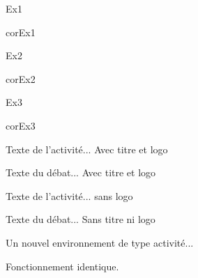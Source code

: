 \documentclass[nocrop]{sesamanuel}
\begin{document}
\begin{autoeval}
  \begin{multicols}{2}
    \begin{exercice}
      Ex1
    \end{exercice}
    \begin{corrige}
      corEx1
    \end{corrige}
    \begin{exercice}
      Ex2
    \end{exercice}
    \begin{corrige}
      corEx2
    \end{corrige}
\vfill \columnbreak
    \begin{exercice}
      Ex3
    \end{exercice}
    \begin{corrige}
      corEx3
    \end{corrige}
  \end{multicols}
\end{autoeval}


  \activites
  \begin{activite}
  Texte de l’activité... Avec titre et logo
  \end{activite}
  \begin{debat}
  Texte du débat... Avec titre et logo
  \end{debat}
  \begin{activite}
  Texte de l’activité... sans logo
  \end{activite}
  \begin{debat}
  Texte du débat... Sans titre ni logo
  \end{debat}
  \begin{nouveau}[titre][\tice]
  Un nouvel environnement de type activité...

  Fonctionnement identique.
  \end{nouveau}
\end{document}
